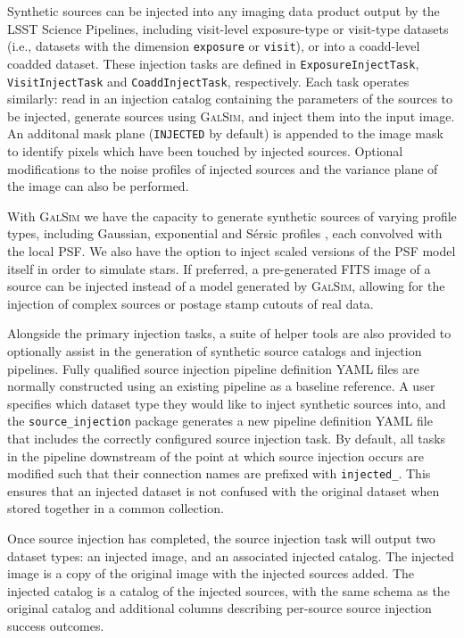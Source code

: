 Synthetic sources can be injected into any imaging data product output by the LSST Science Pipelines, including visit-level exposure-type or visit-type datasets (i.e., datasets with the dimension \texttt{exposure} or \texttt{visit}), or into a coadd-level coadded dataset.
These injection tasks are defined in \texttt{ExposureInjectTask}, \texttt{VisitInjectTask} and \texttt{CoaddInjectTask}, respectively.
Each task operates similarly: read in an injection catalog containing the parameters of the sources to be injected, generate sources using \textsc{GalSim}, and inject them into the input image.
An additonal mask plane (\texttt{INJECTED} by default) is appended to the image mask to identify pixels which have been touched by injected sources.
Optional modifications to the noise profiles of injected sources and the variance plane of the image can also be performed.

With \textsc{GalSim} we have the capacity to generate synthetic sources of varying profile types, including Gaussian, exponential and Sérsic profiles \citep{1963BAAA....6...41S, 1968adga.book.....S}, each convolved with the local PSF.
We also have the option to inject scaled versions of the PSF model itself in order to simulate stars.
If preferred, a pre-generated FITS image of a source can be injected instead of a model generated by \textsc{GalSim}, allowing for the injection of complex sources or postage stamp cutouts of real data.

Alongside the primary injection tasks, a suite of helper tools are also provided to optionally assist in the generation of synthetic source catalogs and injection pipelines.
Fully qualified source injection pipeline definition YAML files are normally constructed using an existing pipeline as a baseline reference.
A user specifies which dataset type they would like to inject synthetic sources into, and the \texttt{source\_injection} package generates a new pipeline definition YAML file that includes the correctly configured source injection task.
By default, all tasks in the pipeline downstream of the point at which source injection occurs are modified such that their connection names are prefixed with \texttt{injected\_}.
This ensures that an injected dataset is not confused with the original dataset when stored together in a common collection.

Once source injection has completed, the source injection task will output two dataset types: an injected image, and an associated injected catalog.
The injected image is a copy of the original image with the injected sources added.
The injected catalog is a catalog of the injected sources, with the same schema as the original catalog and additional columns describing per-source source injection success outcomes.
